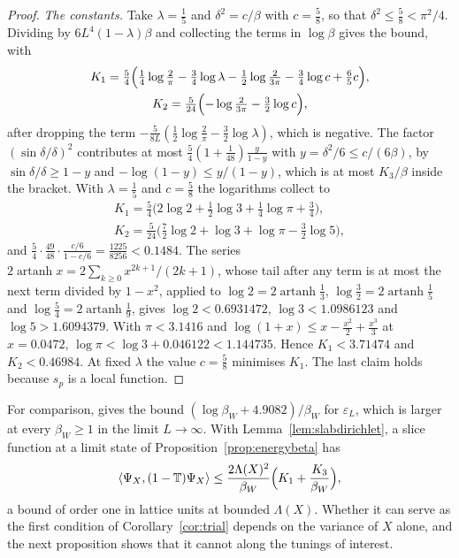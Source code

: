 \documentclass[aps,prd,twocolumn,superscriptaddress,nofootinbib,longbibliography,floatfix,amsmath,amssymb,10pt]{revtex4-2}
\theoremstyle{definition}
\theoremstyle{remark}
\newcommand{\ip}[2]{\langle #1,#2\rangle}
\begin{document}
\begin{proof}
\emph{The constants.} Take $\lambda=\frac15$ and $\delta^2=c/\beta$ with
$c=\frac58$, so that $\delta^2\le\frac58<\pi^2/4$. Dividing by
$6L^4(1-\lambda)\beta$ and collecting the terms in $\log\beta$ gives the
bound, with
\begin{gather*}
K_1=\tfrac54\Bigl(\tfrac14\log\tfrac2\pi-\tfrac34\log\lambda-\tfrac12\log
\tfrac2{3\pi}-\tfrac34\log c+\tfrac65c\Bigr),\\
K_2=\tfrac5{24}\Bigl(-\log\tfrac2{3\pi}-\tfrac32\log c\Bigr),
\end{gather*}
after dropping the term $-\frac5{8L}(\frac12\log\frac2\pi-\frac32\log
\lambda)$, which is negative. The factor $(\sin\delta/\delta)^2$ contributes
at most $\frac54(1+\frac1{48})\frac{y}{1-y}$ with $y=\delta^2/6\le c/(6\beta)$,
by $\sin\delta/\delta\ge1-y$ and $-\log(1-y)\le y/(1-y)$, which is at
most $K_3/\beta$ inside the bracket. With $\lambda=\frac15$ and $c=\frac58$
the logarithms collect to
\begin{gather*}
K_1=\tfrac54\bigl(2\log2+\tfrac12\log3+\tfrac14\log\pi+\tfrac34\bigr),\\
K_2=\tfrac5{24}\bigl(\tfrac72\log2+\log3+\log\pi-\tfrac32\log5\bigr),
\end{gather*}
and $\frac54\cdot\frac{49}{48}\cdot\frac{c/6}{1-c/6}=\frac{1225}{8256}<
0.1484$. The series $2\operatorname{artanh}x=2\sum_{k\ge0}x^{2k+1}/(2k+1)$,
whose tail after any term is at most the next term divided by $1-x^2$,
applied to $\log2=2\operatorname{artanh}\frac13$, $\log\frac32=2\operatorname
{artanh}\frac15$ and $\log\frac54=2\operatorname{artanh}\frac19$, gives
$\log2<0.6931472$, $\log3<1.0986123$ and $\log5>1.6094379$. With $\pi<3.1416$
and $\log(1+x)\le x-\frac{x^2}2+\frac{x^3}3$ at $x=0.0472$, $\log\pi<\log3+
0.046122<1.144735$. Hence $K_1<3.71474$ and $K_2<0.46984$. At fixed $\lambda$ the
value $c=\frac58$ minimises $K_1$. The last claim holds because $s_p$ is a local
function.
\end{proof}

For comparison, \cite[Lemma~382]{BBLR26} gives the bound $(\log\beta_W+
4.9082)/\beta_W$ for $\varepsilon_L$, which is larger at every $\beta_W\ge1$
in the limit $L\to\infty$.
With Lemma~\ref{lem:slabdirichlet}, a slice function at a limit state of
Proposition~\ref{prop:energybeta} has
\[
\ip{\Psi_X}{(1-\mathbb T)\Psi_X}\le\frac{2\Lambda(X)^2}{\beta_W}\Bigl(K_1+
\frac{K_3}{\beta_W}\Bigr),
\]
a bound of order one in lattice units at bounded $\Lambda(X)$. Whether it can
serve as the first condition of Corollary~\ref{cor:trial} depends on the
variance of $X$ alone, and the next proposition shows that it cannot along
the tunings of interest.
\end{document}
